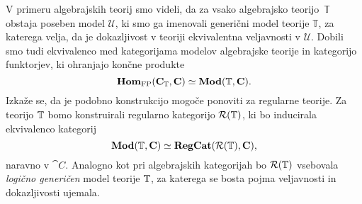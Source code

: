 \documentclass[../kategoricna_logika.tex]{subfiles}
\begin{document}
V primeru algebrajskih teorij smo videli, da za vsako algebrajsko
teorijo~$\mathbb{T}$ obstaja poseben model $\mathcal{U}$, ki smo ga
imenovali generični model teorije $\mathbb{T}$, za katerega velja, da
je dokazljivost v teoriji ekvivalentna veljavnosti v $\mathcal{U}$.
Dobili smo tudi ekvivalenco med kategorijama modelov algebrajske
teorije in kategorijo funktorjev, ki ohranjajo končne produkte
$$\mathbf{Hom}_{\mathrm{FP}}({\operatorname{\mathbf{C}}}_{\mathbb{T}}, {\operatorname{\mathbf{C}}}) \simeq \mathbf{Mod}(\mathbb{T}, {\operatorname{\mathbf{C}}}).$$
Izkaže se, da je podobno konstrukcijo mogoče ponoviti za regularne
teorije.  Za teorijo $\mathbb{T}$ bomo konstruirali regularno kategorijo
$\mathcal{R}(\mathbb{T})$, ki bo inducirala ekvivalenco kategorij
$$\mathbf{Mod}(\mathbb{T}, {\operatorname{\mathbf{C}}}) \simeq {\operatorname{\mathbf{RegCat}}}(\mathcal{R}(\mathbb{T}), {\operatorname{\mathbf{C}}}),$$
naravno v $\cat{C}$. Analogno kot pri algebrajskih kategorijah bo
$\mathcal{R}(\mathbb{T})$ vsebovala \emph{logično generičen} model teorije
$\mathbb{T}$, za katerega se bosta pojma veljavnosti in dokazljivosti ujemala.
\end{document}
